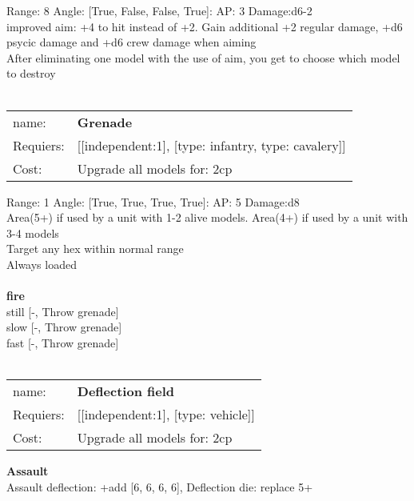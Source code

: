 Range: 8  Angle: [True, False, False, True]: AP: 3 Damage:d6-2 \\
improved aim: +4 to hit instead of +2. Gain additional +2 regular damage, +d6 psycic damage and +d6 crew damage when aiming\\ 
After eliminating one model with the use of aim, you get to choose which model to destroy\\ 








\ \\
\begin{tabular}{ll}
name: & {\bf Grenade } \\
Requiers: & [[independent:1], [type: infantry, type: cavalery]] \\
Cost: & Upgrade all models for: 2cp \\
\end{tabular}



Range: 1  Angle: [True, True, True, True]: AP: 5 Damage:d8 \\
Area(5+) if used by a unit with 1-2 alive models. Area(4+) if used by a unit with 3-4 models\\ 
Target any hex within normal range\\ 
Always loaded\\ 







\ \\ {\bf fire } \\
still [-, Throw grenade] \\
slow [-, Throw grenade] \\
fast [-, Throw grenade] \\

\ \\
\begin{tabular}{ll}
name: & {\bf Deflection field } \\
Requiers: & [[independent:1], [type: vehicle]] \\
Cost: & Upgrade all models for: 2cp \\
\end{tabular}





{\bf Assault} \ \\
Assault deflection: +add [6, 6, 6, 6], Deflection die: replace 5+
\\ 




